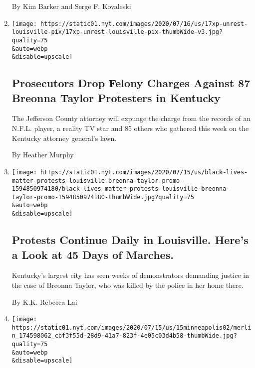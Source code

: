 \begin{enumerate}
  By Kim Barker and Serge F. Kovaleski
\item
  \href{/2020/07/17/us/breonna-taylor-louisville-protests.html}{}

  \texttt{[image: https://static01.nyt.com/images/2020/07/16/us/17xp-unrest-louisville-pix/17xp-unrest-louisville-pix-thumbWide-v3.jpg?quality=75\\\&auto=webp\\\&disable=upscale]}

  \hypertarget{prosecutors-drop-felony-charges-against-87-breonna-taylor-protesters-in-kentucky}{%
  \subsection{Prosecutors Drop Felony Charges Against 87 Breonna Taylor
  Protesters in
  Kentucky}\label{prosecutors-drop-felony-charges-against-87-breonna-taylor-protesters-in-kentucky}}

  The Jefferson County attorney will expunge the charge from the records
  of an N.F.L. player, a reality TV star and 85 others who gathered this
  week on the Kentucky attorney general's lawn.

  By Heather Murphy
\item
  \href{/interactive/2020/07/16/us/black-lives-matter-protests-louisville-breonna-taylor.html}{}

  \texttt{[image: https://static01.nyt.com/images/2020/07/15/us/black-lives-matter-protests-louisville-breonna-taylor-promo-1594850974180/black-lives-matter-protests-louisville-breonna-taylor-promo-1594850974180-thumbWide.jpg?quality=75\\\&auto=webp\\\&disable=upscale]}

  \hypertarget{protests-continue-daily-in-louisville-heres-a-look-at-45-days-of-marches}{%
  \subsection{Protests Continue Daily in Louisville. Here's a Look at 45
  Days of
  Marches.}\label{protests-continue-daily-in-louisville-heres-a-look-at-45-days-of-marches}}

  Kentucky's largest city has seen weeks of demonstrators demanding
  justice in the case of Breonna Taylor, who was killed by the police in
  her home there.

  By K.K. Rebecca Lai
\item
  \href{/video/us/100000007241193/george-floyd-civil-lawsuit-minneapolis.html}{}

  \texttt{[image: https://static01.nyt.com/images/2020/07/15/us/15minneapolis02/merlin\_174598062\_cbf3f55d-28d9-41a7-823f-4e05c03d4b58-thumbWide.jpg?quality=75\\\&auto=webp\\\&disable=upscale]}


\end{enumerate}
